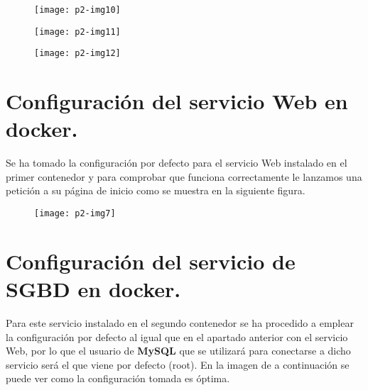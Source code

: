 \documentclass[10pt]{article}
\begin{document}
\begin{figure}[H]
	\begin{center}
 		\texttt{[image: p2-img10]}
	\end{center} 
\end{figure}

\begin{figure}[H]
	\begin{center}
 		\texttt{[image: p2-img11]}
	\end{center} 
\end{figure}

\begin{figure}[H]
	\begin{center}
 		\texttt{[image: p2-img12]}
	\end{center} 
\end{figure}


\section{Configuración del servicio Web en docker.} 
Se ha tomado la configuración por defecto para el servicio Web instalado en el primer contenedor y para comprobar que funciona correctamente le lanzamos una petición a su página de inicio como se muestra en la siguiente figura.\\

\begin{figure}[H]
	\begin{center}
 		\texttt{[image: p2-img7]}
	\end{center} 
\end{figure}


\section{Configuración del servicio de SGBD en docker.} 
Para este servicio instalado en el segundo contenedor se ha procedido a emplear la configuración por defecto al igual que en el apartado anterior con el servicio Web, por lo que el usuario de \textbf{MySQL} que se utilizará para conectarse a dicho servicio será el que viene por defecto (root). En la imagen de a continuación se puede ver como la configuración tomada es óptima. \\
\end{document}

